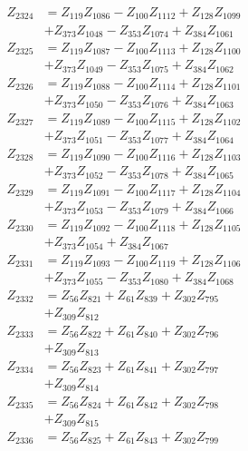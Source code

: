 \begin{multicols}{2}
\begin{align}
Z_{2324} &= Z_{119}Z_{1086} - Z_{100}Z_{1112} + Z_{128}Z_{1099}  \nonumber \\
&+ Z_{373}Z_{1048} - Z_{353}Z_{1074} + Z_{384}Z_{1061} \nonumber \\
Z_{2325} &= Z_{119}Z_{1087} - Z_{100}Z_{1113} + Z_{128}Z_{1100}  \nonumber \\
&+ Z_{373}Z_{1049} - Z_{353}Z_{1075} + Z_{384}Z_{1062} \nonumber \\
Z_{2326} &= Z_{119}Z_{1088} - Z_{100}Z_{1114} + Z_{128}Z_{1101}  \nonumber \\
&+ Z_{373}Z_{1050} - Z_{353}Z_{1076} + Z_{384}Z_{1063} \nonumber \\
Z_{2327} &= Z_{119}Z_{1089} - Z_{100}Z_{1115} + Z_{128}Z_{1102}  \nonumber \\
&+ Z_{373}Z_{1051} - Z_{353}Z_{1077} + Z_{384}Z_{1064} \nonumber \\
Z_{2328} &= Z_{119}Z_{1090} - Z_{100}Z_{1116} + Z_{128}Z_{1103}  \nonumber \\
&+ Z_{373}Z_{1052} - Z_{353}Z_{1078} + Z_{384}Z_{1065} \nonumber \\
Z_{2329} &= Z_{119}Z_{1091} - Z_{100}Z_{1117} + Z_{128}Z_{1104}  \nonumber \\
&+ Z_{373}Z_{1053} - Z_{353}Z_{1079} + Z_{384}Z_{1066} \nonumber \\
Z_{2330} &= Z_{119}Z_{1092} - Z_{100}Z_{1118} + Z_{128}Z_{1105}  \nonumber \\
&+ Z_{373}Z_{1054} + Z_{384}Z_{1067} \nonumber \\
Z_{2331} &= Z_{119}Z_{1093} - Z_{100}Z_{1119} + Z_{128}Z_{1106}  \nonumber \\
&+ Z_{373}Z_{1055} - Z_{353}Z_{1080} + Z_{384}Z_{1068} \nonumber \\
Z_{2332} &= Z_{56}Z_{821} + Z_{61}Z_{839} + Z_{302}Z_{795}  \nonumber \\
&+ Z_{309}Z_{812} \nonumber \\
Z_{2333} &= Z_{56}Z_{822} + Z_{61}Z_{840} + Z_{302}Z_{796}  \nonumber \\
&+ Z_{309}Z_{813} \nonumber \\
Z_{2334} &= Z_{56}Z_{823} + Z_{61}Z_{841} + Z_{302}Z_{797}  \nonumber \\
&+ Z_{309}Z_{814} \nonumber \\
Z_{2335} &= Z_{56}Z_{824} + Z_{61}Z_{842} + Z_{302}Z_{798}  \nonumber \\
&+ Z_{309}Z_{815} \nonumber \\
Z_{2336} &= Z_{56}Z_{825} + Z_{61}Z_{843} + Z_{302}Z_{799}  \nonumber \\

\end{align}
\end{multicols}
